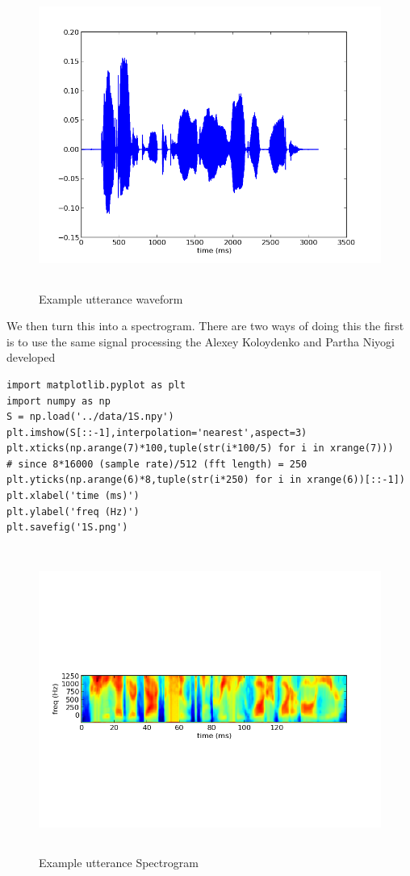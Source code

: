 \documentclass[11pt]{article}
\begin{document}
\begin{figure}[htb]
\centering
\includegraphics[height=10cm]{./1s.png}
\caption{\label{fig:1s}Example utterance waveform}
\end{figure}

We then turn this into a spectrogram.  There are two ways of doing this
the first is to use the same signal processing the Alexey Koloydenko
and Partha Niyogi developed




\begin{verbatim}
import matplotlib.pyplot as plt
import numpy as np
S = np.load('../data/1S.npy')
plt.imshow(S[::-1],interpolation='nearest',aspect=3)
plt.xticks(np.arange(7)*100,tuple(str(i*100/5) for i in xrange(7)))
# since 8*16000 (sample rate)/512 (fft length) = 250
plt.yticks(np.arange(6)*8,tuple(str(i*250) for i in xrange(6))[::-1])
plt.xlabel('time (ms)')
plt.ylabel('freq (Hz)')
plt.savefig('1S.png')
\end{verbatim}


\begin{figure}[htb]
\centering
\includegraphics[height=10cm]{./1S.png}
\caption{\label{fig:1S}Example utterance Spectrogram}
\end{figure}
\end{document}
